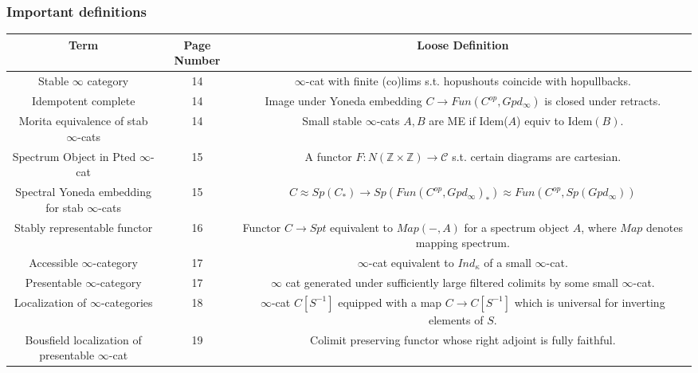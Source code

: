 \documentclass[letterpaper]{article}
\theoremstyle{definition}
\newcommand{\Z}{\mathbb Z}
\newcommand{\mc}{\mathcal}
\begin{document}
\subsubsection{Important definitions}
\begin{tabulary}{0.7 \textwidth}{|C|C|C|}
\hline
Term & Page Number & Loose Definition\\
\hline
\hline
Stable $\infty$ category & 14 & $\infty$-cat with finite (co)lims
                                s.t. hopushouts coincide with hopullbacks.\\
\hline
Idempotent complete & 14 & Image under Yoneda
                           embedding $C \rightarrow Fun(C^{op},Gpd_\infty)$ is closed under retracts.\\
\hline
Morita equivalence of stab $\infty$-cats& 14& Small stable
                                              $\infty$-cats $A,B$ are
                                              ME if Idem($A$) equiv to
  Idem$(B)$.\\
\hline
Spectrum Object in Pted $\infty$-cat & 15& A functor $F : N(\Z \times
                                           \Z) \rightarrow \mc C$
                                           s.t. certain diagrams are cartesian.\\
\hline
Spectral Yoneda embedding for stab $\infty$-cats & 15 & $C \approx
                                                        Sp(C_*)
                                                        \rightarrow
                                                        Sp(Fun(C^{op},Gpd_{\infty})_*)
  \approx Fun(C^{op},Sp(Gpd_{\infty}))$\\
\hline
Stably representable functor & 16 & Functor $C \rightarrow Spt$ equivalent to $Map(-,A)$
                                    for a spectrum object $A$, where
                                    $Map$ denotes mapping spectrum.\\
\hline
Accessible $\infty$-category & 17 & $\infty$-cat equivalent to $Ind_\kappa$ of
                                    a small $\infty$-cat.\\
\hline
Presentable $\infty$-category & 17 & $\infty$ cat generated under
                                     sufficiently large filtered
                                     colimits by some small $\infty$-cat.\\
\hline
Localization of $\infty$-categories & 18 & $\infty$-cat $C[S^{-1}]$
                                           equipped with a map $C
                                           \rightarrow C[S^{-1}]$
                                           which is universal for
                                           inverting elements of $S$.\\
\hline
Bousfield localization of presentable $\infty$-cat & 19 & Colimit
                                                          preserving
                                                          functor
                                                          whose right
                                                          adjoint is
                                                          fully faithful.\\
\hline
\end{tabulary}
\end{document}
